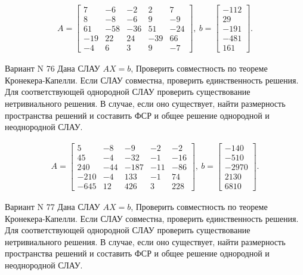 \documentclass[11pt]{report}
\begin{document}
\begin{align*}
 A = \left[\begin{matrix}7 & -6 & -2 & 2 & 7\\8 & -8 & -6 & 9 & -9\\61 & -58 & -36 & 51 & -24\\-19 & 22 & 24 & -39 & 66\\-4 & 6 & 3 & 9 & -7\end{matrix}\right],
\ b = \left[\begin{matrix}-112\\29\\-191\\-481\\161\end{matrix}\right]. 
 \end{align*}

Вариант N 76
Дана СЛАУ $AX = b$,
Проверить совместность по теореме Кронекера-Капелли. Если СЛАУ совместна, проверить единственность решения.
Для соответствующей однородной СЛАУ проверить существование нетривиального решения. В случае, если оно существует,
найти размерность пространства решений и составить ФСР и общее решение однородной  и неоднородной СЛАУ.


\begin{align*}
 A = \left[\begin{matrix}5 & -8 & -9 & -2 & -2\\45 & -4 & -32 & -1 & -16\\240 & -44 & -187 & -11 & -86\\-210 & -4 & 133 & -1 & 74\\-645 & 12 & 426 & 3 & 228\end{matrix}\right],
\ b = \left[\begin{matrix}-140\\-510\\-2970\\2130\\6810\end{matrix}\right]. 
 \end{align*}

Вариант N 77
Дана СЛАУ $AX = b$,
Проверить совместность по теореме Кронекера-Капелли. Если СЛАУ совместна, проверить единственность решения.
Для соответствующей однородной СЛАУ проверить существование нетривиального решения. В случае, если оно существует,
найти размерность пространства решений и составить ФСР и общее решение однородной  и неоднородной СЛАУ.
\end{document}
